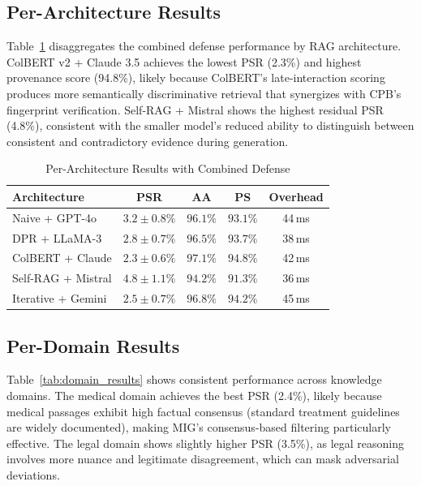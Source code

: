 \documentclass[journal,10pt]{IEEEtran}
\begin{document}
\subsection{Per-Architecture Results}

Table~\ref{tab:arch_results} disaggregates the combined defense performance by RAG architecture. ColBERT v2 + Claude 3.5 achieves the lowest PSR (2.3\%) and highest provenance score (94.8\%), likely because ColBERT's late-interaction scoring produces more semantically discriminative retrieval that synergizes with CPB's fingerprint verification. Self-RAG + Mistral shows the highest residual PSR (4.8\%), consistent with the smaller model's reduced ability to distinguish between consistent and contradictory evidence during generation.

\begin{table}[t]
\centering
\caption{Per-Architecture Results with Combined Defense}
\label{tab:arch_results}
\renewcommand{\arraystretch}{1.1}
\scriptsize
\begin{tabular}{@{}l c c c c@{}}
\toprule
\textbf{Architecture} & \textbf{PSR} & \textbf{AA} & \textbf{PS} & \textbf{Overhead} \\
\midrule
Naive + GPT-4o & $3.2 \pm 0.8\%$ & $96.1\%$ & $93.1\%$ & 44\,ms \\
DPR + LLaMA-3 & $2.8 \pm 0.7\%$ & $96.5\%$ & $93.7\%$ & 38\,ms \\
ColBERT + Claude & $2.3 \pm 0.6\%$ & $97.1\%$ & $94.8\%$ & 42\,ms \\
Self-RAG + Mistral & $4.8 \pm 1.1\%$ & $94.2\%$ & $91.3\%$ & 36\,ms \\
Iterative + Gemini & $2.5 \pm 0.7\%$ & $96.8\%$ & $94.2\%$ & 45\,ms \\
\bottomrule
\end{tabular}
\end{table}

\subsection{Per-Domain Results}
Table~\ref{tab:domain_results} shows consistent performance across knowledge domains. The medical domain achieves the best PSR (2.4\%), likely because medical passages exhibit high factual consensus (standard treatment guidelines are widely documented), making MIG's consensus-based filtering particularly effective. The legal domain shows slightly higher PSR (3.5\%), as legal reasoning involves more nuance and legitimate disagreement, which can mask adversarial deviations.
\end{document}
